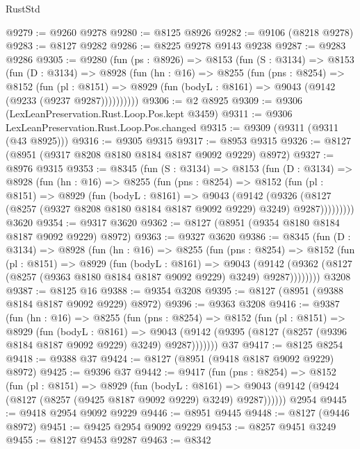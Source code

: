 \begin{lexlean}{RustStd}
\begin{coremodule}
@9279 := @9260 @9278
@9280 := @8125 @8926
@9282 := @9106 (@8218 @9278)
@9283 := @8127 @9282
@9286 := @8225 @9278 @9143 @9238
@9287 := @9283 @9286
@9305 := @9280
    (fun (ps : @8926) =>
    @8153
      (fun (S : @3134) =>
      @8153
        (fun (D : @3134) =>
        @8928
          (fun (hn : @16) =>
          @8255
            (fun (pns : @8254) =>
            @8152
              (fun (pl : @8151) =>
              @8929 (fun (bodyL : @8161) => @9043 (@9142 (@9233 (@9237 @9287))))))))))
@9306 := @2 @8925
@9309 := @9306 (LexLeanPreservation.Rust.Loop.Pos.kept @3459)
@9311 := @9306 LexLeanPreservation.Rust.Loop.Pos.changed
@9315 := @9309 (@9311 (@9311 (@43 @8925)))
@9316 := @9305 @9315
@9317 := @8953 @9315
@9326 := @8127 (@8951 (@9317 @8208 @8180 @8184 @8187 @9092 @9229) @8972)
@9327 := @8976 @9315
@9353 := @8345
    (fun (S : @3134) =>
    @8153
      (fun (D : @3134) =>
      @8928
        (fun (hn : @16) =>
        @8255
          (fun (pns : @8254) =>
          @8152
            (fun (pl : @8151) =>
            @8929
              (fun (bodyL : @8161) =>
              @9043
                (@9142
                  (@9326
                    (@8127 (@8257 (@9327 @8208 @8180 @8184 @8187 @9092 @9229) @3249) @9287)))))))))
    @3620
@9354 := @9317 @3620
@9362 := @8127 (@8951 (@9354 @8180 @8184 @8187 @9092 @9229) @8972)
@9363 := @9327 @3620
@9386 := @8345
    (fun (D : @3134) =>
    @8928
      (fun (hn : @16) =>
      @8255
        (fun (pns : @8254) =>
        @8152
          (fun (pl : @8151) =>
          @8929
            (fun (bodyL : @8161) =>
            @9043
              (@9142 (@9362 (@8127 (@8257 (@9363 @8180 @8184 @8187 @9092 @9229) @3249) @9287))))))))
    @3208
@9387 := @8125 @16
@9388 := @9354 @3208
@9395 := @8127 (@8951 (@9388 @8184 @8187 @9092 @9229) @8972)
@9396 := @9363 @3208
@9416 := @9387
    (fun (hn : @16) =>
    @8255
      (fun (pns : @8254) =>
      @8152
        (fun (pl : @8151) =>
        @8929
          (fun (bodyL : @8161) =>
          @9043 (@9142 (@9395 (@8127 (@8257 (@9396 @8184 @8187 @9092 @9229) @3249) @9287)))))))
    @37
@9417 := @8125 @8254
@9418 := @9388 @37
@9424 := @8127 (@8951 (@9418 @8187 @9092 @9229) @8972)
@9425 := @9396 @37
@9442 := @9417
    (fun (pns : @8254) =>
    @8152
      (fun (pl : @8151) =>
      @8929
        (fun (bodyL : @8161) =>
        @9043 (@9142 (@9424 (@8127 (@8257 (@9425 @8187 @9092 @9229) @3249) @9287))))))
    @2954
@9445 := @9418 @2954 @9092 @9229
@9446 := @8951 @9445
@9448 := @8127 (@9446 @8972)
@9451 := @9425 @2954 @9092 @9229
@9453 := @8257 @9451 @3249
@9455 := @8127 @9453 @9287
@9463 := @8342

\end{coremodule}
\end{lexlean}
